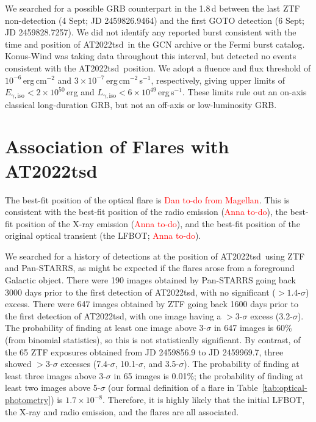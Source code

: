 \documentclass{nature_plusfigure}
\newcommand{\at}{AT2022tsd}
\begin{document}
\begin{methods}
We searched for a possible GRB counterpart in the 1.8\,d between the last ZTF non-detection (4 Sept; JD 2459826.9464) and the first GOTO detection (6 Sept; JD 2459828.7257). We did not identify any reported burst consistent with the time and position of \at\ in the GCN archive or the Fermi burst catalog. Konus-Wind was taking data throughout this interval, but detected no events consistent with the \at\ position. We adopt a  fluence and flux threshold of $10^{-6}\,$erg\,cm$^{-2}$ and $3\times10^{-7}\,$erg\,cm$^{-2}$\,s$^{-1}$, respectively\cite{Tsvetkova2017},
giving upper limits of $E_\mathrm{\gamma,iso}<2\times10^{50}\,$erg and $L_{\gamma,\mathrm{iso}}<6\times10^{49}\,$erg\,s$^{-1}$.
These limits rule out an on-axis classical long-duration GRB, but not an off-axis or low-luminosity GRB\cite{Cano2017}.

\section{Association of Flares with \at}
\label{sec:flare-association}

The best-fit position of the optical flare is \textcolor{red}{Dan to-do from Magellan}. This is consistent with the best-fit position of the radio emission (\textcolor{red}{Anna to-do}), the best-fit position of the X-ray emission (\textcolor{red}{Anna to-do}), and the best-fit position of the original optical transient (the LFBOT; \textcolor{red}{Anna to-do}). 

We searched for a history of detections at the position of \at\ using ZTF and Pan-STARRS, as might be expected if the flares arose from a foreground Galactic object. There were 190 images obtained by Pan-STARRS going back 3000 days prior to the first detection of \at, with no significant ($>1.4$-$\sigma$) excess\cite{Fulton2022}. There were 647 images obtained by ZTF going back 1600 days prior to the first detection of \at, with one image having a $>3$-$\sigma$ excess (3.2-$\sigma$). The probability of finding at least one image above 3-$\sigma$ in 647 images is 60\% (from binomial statistics), so this is not statistically significant. By contrast, of the 65 ZTF exposures obtained from JD 2459856.9 to JD 2459969.7, three showed $>3$-$\sigma$ excesses (7.4-$\sigma$, 10.1-$\sigma$, and 3.5-$\sigma$). The probability of finding at least three images above 3-$\sigma$ in 65 images is 0.01\%; the probability of finding at least two images above 5-$\sigma$ (our formal definition of a flare in Table~\ref{tab:optical-photometry}) is $1.7\times10^{-8}$. Therefore, it is highly likely that the initial LFBOT, the X-ray and radio emission, and the flares are all associated. 


\end{methods}
\end{document}
